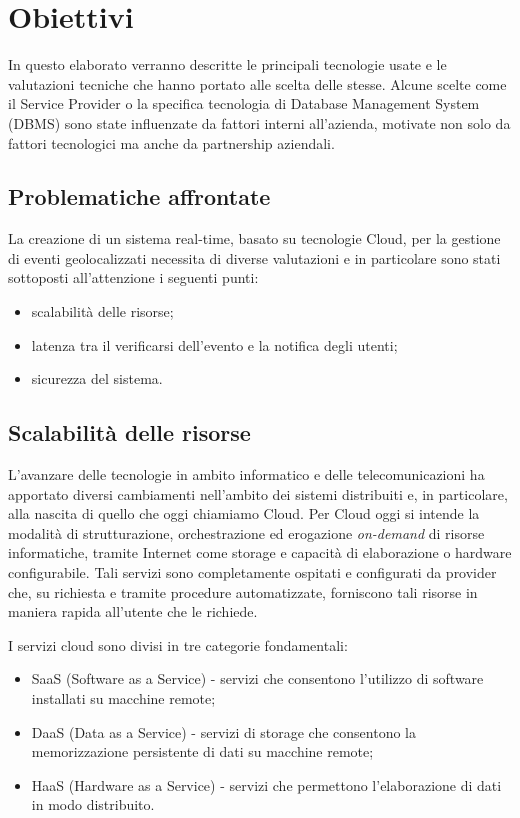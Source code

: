 \chapter{Obiettivi}
In questo elaborato verranno descritte le principali tecnologie usate e le valutazioni tecniche che hanno portato alle scelta delle stesse. Alcune scelte come il Service Provider o la specifica tecnologia di Database Management System (DBMS) sono state influenzate da fattori interni all'azienda, motivate non solo da fattori tecnologici ma anche da partnership aziendali.


\section{Problematiche affrontate}
La creazione di un sistema real-time, basato su tecnologie Cloud, per la gestione di eventi geolocalizzati necessita di diverse valutazioni e in particolare sono stati sottoposti all'attenzione i seguenti punti:
\begin{itemize}
\item scalabilità delle risorse;
\item latenza tra il verificarsi dell'evento e la notifica degli utenti;
\item sicurezza del sistema.
\end{itemize}

\section*{Scalabilità delle risorse}
L'avanzare delle tecnologie in ambito informatico e delle telecomunicazioni ha apportato diversi cambiamenti nell'ambito dei sistemi distribuiti e, in particolare, alla nascita di quello che oggi chiamiamo Cloud.
Per Cloud oggi si intende la modalità di strutturazione, orchestrazione ed erogazione {\itshape on-demand} di risorse informatiche, tramite Internet come storage e capacità di elaborazione o hardware configurabile. Tali servizi sono completamente ospitati e configurati da provider che, su richiesta e tramite procedure automatizzate, forniscono tali risorse in maniera rapida all'utente che le richiede.

I servizi cloud sono divisi in tre categorie fondamentali:
\begin{itemize}
\item SaaS (Software as a Service) - servizi che consentono l'utilizzo di software installati su macchine remote;
\item DaaS (Data as a Service) - servizi di storage che consentono la memorizzazione persistente di dati su macchine remote;
\item HaaS (Hardware as a Service) - servizi che permettono l'elaborazione di dati in modo distribuito.
\end{itemize}

